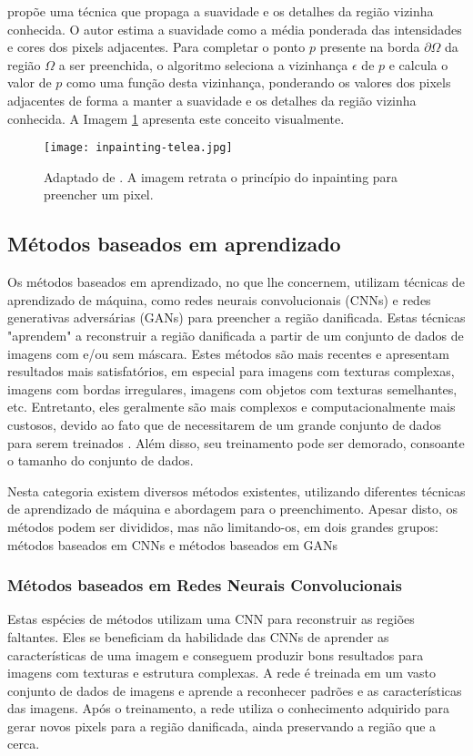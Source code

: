 \cite{Telea2004} propõe uma técnica que propaga a suavidade e os detalhes da região vizinha conhecida. O autor estima a suavidade como a média ponderada das intensidades e cores dos pixels adjacentes. Para completar o ponto $p$ presente na borda $\partial \Omega$ da região $\Omega$ a ser preenchida, o algoritmo seleciona a vizinhança $\epsilon$ de $p$ e calcula o valor de $p$ como uma função desta vizinhança, ponderando os valores dos pixels adjacentes de forma a manter a suavidade e os detalhes da região vizinha conhecida. A Imagem \ref{fig:telea} apresenta este conceito visualmente. 

\begin{figure}[h]
\centering
\texttt{[image: inpainting-telea.jpg]}
\caption{Adaptado de \cite{Telea2004}. A imagem retrata o princípio do inpainting para preencher um pixel.
} 
\label{fig:telea}
\end{figure}

\subsection{Métodos baseados em aprendizado} \label{learn-based}
Os métodos baseados em aprendizado, no que lhe concernem, utilizam técnicas de aprendizado de máquina, como redes neurais convolucionais (CNNs) e redes generativas adversárias (GANs) para preencher a região danificada. Estas técnicas "aprendem" a reconstruir a região danificada a partir de um conjunto de dados de imagens com e/ou sem máscara. Estes métodos são mais recentes e apresentam resultados mais satisfatórios, em especial para imagens com texturas complexas, imagens com bordas irregulares, imagens com objetos com texturas semelhantes, etc. Entretanto, eles geralmente são mais complexos e computacionalmente mais custosos, devido ao fato que de necessitarem de um grande conjunto de dados para serem treinados \cite{Goodfellow-et-al-2016}. Além disso, seu treinamento pode ser demorado, consoante o tamanho do conjunto de dados.

Nesta categoria existem diversos métodos existentes, utilizando diferentes técnicas de aprendizado de máquina e abordagem para o preenchimento. Apesar disto, os métodos podem ser divididos, mas não limitando-os, em dois grandes grupos: métodos baseados em CNNs e métodos baseados em GANs

\subsubsection{Métodos baseados em Redes Neurais Convolucionais} \label{cnn-based}
Estas espécies de métodos utilizam uma CNN para reconstruir as regiões faltantes. Eles se beneficiam da habilidade das CNNs de aprender as características de uma imagem e conseguem produzir bons resultados para imagens com texturas e estrutura complexas. A rede é treinada em um vasto conjunto de dados de imagens e aprende a reconhecer padrões e as características das imagens. Após o treinamento, a rede utiliza o conhecimento adquirido para gerar novos pixels para a região danificada, ainda preservando a região que a cerca.



